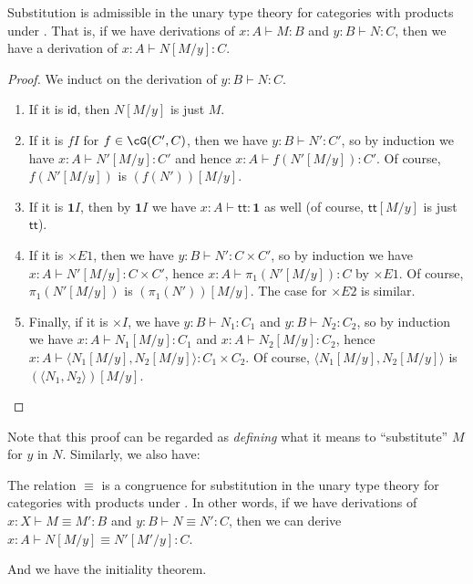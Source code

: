 \documentclass{book}
\let\types\vdash
\def\idfunc{\mathsf{id}}
\def\unit{\mathbf{1}}
\def\ttt{\mathsf{tt}}
\def\timesE{\mathord{\times}E}
\def\timesI{\mathord{\times}I}
\def\pair#1#2{\langle #1,#2\rangle}
\begin{document}
\begin{thm}\label{thm:catprod-subadm}
  Substitution is admissible in the unary type theory for categories with products under \cG.
  That is, if we have derivations of $x:A\types M:B$ and $y:B \types N:C$, then we have a derivation of $x:A \types N[M/y]:C$.
\end{thm}
\begin{proof}
  We induct on the derivation of $y:B \types N:C$.
  \begin{enumerate}
  \item If it is $\idfunc$, then $N[M/y]$ is just $M$.  
  \item If it is $fI$ for $f\in \cG(C',C)$, then we have $y:B \types N':C'$, so by induction we have $x:A\types N'[M/y]:C'$ and hence $x:A\types f(N'[M/y]):C'$.
    Of course, $f(N'[M/y])$ is $(f(N'))[M/y]$.
  \item If it is $\unit I$, then by $\unit I$ we have $x:A \types \ttt:\unit$ as well (of course, $\ttt[M/y]$ is just $\ttt$).
  \item If it is $\timesE1$, then we have $y:B\types N':C\times C'$, so by induction we have $x:A \types N'[M/y]:C\times C'$, hence $x:A \types \pi_1(N'[M/y]):C$ by $\timesE1$.
    Of course, $\pi_1(N'[M/y])$ is $(\pi_1(N'))[M/y]$.
    The case for $\timesE2$ is similar.
  \item Finally, if it is $\timesI$, we have $y:B\types N_1:C_1$ and $y:B\types N_2:C_2$, so by induction we have $x:A \types N_1[M/y]:C_1$ and $x:A \types N_2[M/y]:C_2$, hence $x:A \types \pair{N_1[M/y]}{N_2[M/y]}:C_1\times C_2$.
    Of course, $\pair{N_1[M/y]}{N_2[M/y]}$ is $(\pair{N_1}{N_2})[M/y]$.\qedhere
  \end{enumerate}
\end{proof}

Note that this proof can be regarded as \emph{defining} what it means to ``substitute'' $M$ for $y$ in $N$.
Similarly, we also have:

\begin{thm}\label{thm:catprod-subcong}
  The relation $\equiv$ is a congruence for substitution in the unary type theory for categories with products under \cG.
  In other words, if we have derivations of $x:X \types M\equiv M':B$ and $y:B \types N\equiv N':C$, then we can derive $x:A \types N[M/y] \equiv N'[M'/y]:C$.
\end{thm}

And we have the initiality theorem.
\end{document}
